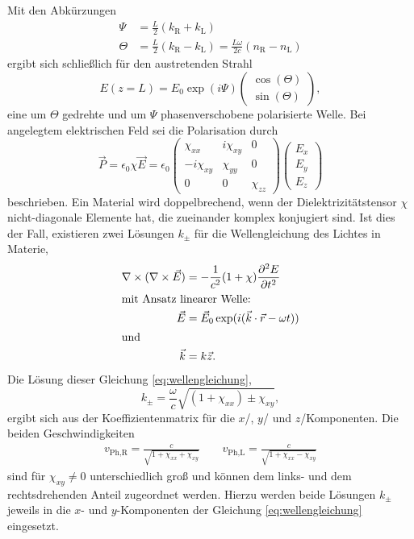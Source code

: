 Mit den Abkürzungen
\begin{align}
    \Psi &= \frac{L}{2} (k_\text{R}+k_\text{L})\\
    \Theta &= \frac{L}{2} (k_\text{R}-k_\text{L}) = \frac{L\omega}{2 c} (n_\text{R}-n_\text{L}) \label{eq:abk_theta}
\end{align}
ergibt sich schließlich für den austretenden Strahl
\begin{equation}
    E(z=L) = E_0 \exp(i\Psi)\begin{pmatrix} \cos(\Theta)\\\sin(\Theta)\end{pmatrix},
\end{equation}
eine um $\Theta$ gedrehte und um $\Psi$ phasenverschobene polarisierte Welle.
Bei angelegtem elektrischen Feld sei die Polarisation durch
\begin{equation}
    \vec P = \epsilon_0 \chi \vec E = \epsilon_0 \begin{pmatrix} \chi_{xx} & i\chi_{xy} & 0 \\ -i\chi_{xy} & \chi_{yy} & 0 \\ 0 & 0 & \chi_{zz} \end{pmatrix} \begin{pmatrix} E_x\\E_y\\E_z \end{pmatrix}
    \label{eq:polarisation}
\end{equation}
beschrieben.
Ein Material wird doppelbrechend, wenn der Dielektrizitätstensor $\chi$ nicht-diagonale Elemente hat, die zueinander komplex konjugiert sind.
Ist dies der Fall, existieren zwei Lösungen $k_{\pm}$ für die Wellengleichung des Lichtes in Materie,
\begin{align}
    \nabla\times(\nabla\times\vec E) &= -\frac{1}{c^2}(1+\chi)\frac{\partial^2 E}{\partial t^2}\label{eq:wellengleichung}\\
    \intertext{mit Ansatz linearer Welle:}
    \vec E &= \vec E_0 \exp(i(\vec k \cdot \vec r - \omega t))\\
    \shortintertext{und}
    \vec k &= k \vec z.
\end{align}
Die Lösung dieser Gleichung \eqref{eq:wellengleichung},
\begin{equation}
    k_\pm = \frac{\omega}{c}\sqrt{(1+\chi_{xx})\pm\chi_{xy}},
\end{equation}
ergibt sich aus der Koeffizientenmatrix für die $x$\-/, $y$\-/ und $z$\-/Komponenten.
Die beiden Geschwindigkeiten
\begin{align}
    v_\text{Ph,R}=\frac{c}{\sqrt{1+\chi_{xx}+\chi_{xy}}} \qquad v_\text{Ph,L}=\frac{c}{\sqrt{1+\chi_{xx}-\chi_{xy}}}
\end{align}
sind für $\chi_{xy}\neq0$ unterschiedlich groß und können dem links- und dem rechtsdrehenden Anteil zugeordnet werden.
Hierzu werden beide Lösungen $k_\pm$ jeweils in die $x$- und $y$-Komponenten der Gleichung \eqref{eq:wellengleichung}
eingesetzt.

